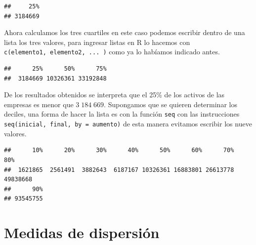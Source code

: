 \documentclass[letterpaper,]{book}
\newenvironment{Shaded}{\begin{snugshade}}{\end{snugshade}}
\newcommand{\DataTypeTok}[1]{\textcolor[rgb]{0.13,0.29,0.53}{#1}}
\newcommand{\FloatTok}[1]{\textcolor[rgb]{0.00,0.00,0.81}{#1}}
\newcommand{\KeywordTok}[1]{\textcolor[rgb]{0.13,0.29,0.53}{\textbf{#1}}}
\newcommand{\NormalTok}[1]{#1}
\newcommand{\OperatorTok}[1]{\textcolor[rgb]{0.81,0.36,0.00}{\textbf{#1}}}
\begin{document}
\begin{verbatim}
##     25% 
## 3184669
\end{verbatim}

Ahora calculamos los tres cuartiles en este caso podemos escribir dentro de una lista los tres valores, para ingresar listas en R lo hacemos con \texttt{c(elemento1,\ elemento2,\ ...\ )} como ya lo habíamos indicado antes.

\begin{Shaded}
\end{Shaded}

\begin{verbatim}
##      25%      50%      75% 
##  3184669 10326361 33192848
\end{verbatim}

De los resultados obtenidos se interpreta que el 25\% de los activos de las empresas es menor que \(3\;184\;669\). Supongamos que se quieren determinar los deciles, una forma de hacer la lista es con la función \texttt{seq} con las instrucciones \texttt{seq(inicial,\ final,\ by\ =\ aumento)} de esta manera evitamos escribir los nueve valores.

\begin{Shaded}
\end{Shaded}

\begin{verbatim}
##      10%      20%      30%      40%      50%      60%      70%      80% 
##  1621865  2561491  3882643  6187167 10326361 16883801 26613778 49838668 
##      90% 
## 93545755
\end{verbatim}

\newpage

\hypertarget{dispersion}{%
\section{Medidas de dispersión}\label{dispersion}}
\end{document}
